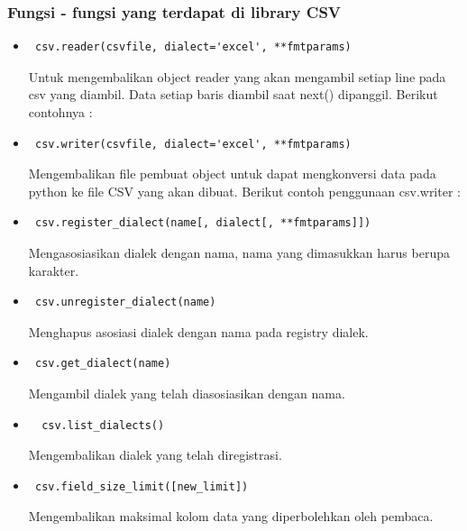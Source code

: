 \subsubsection{Fungsi - fungsi yang terdapat di library CSV}
\begin{itemize}
	\item \begin{verbatim} csv.reader(csvfile, dialect='excel', **fmtparams) \end{verbatim} Untuk mengembalikan	object reader yang akan mengambil setiap line pada csv yang diambil. Data setiap baris diambil saat next() dipanggil. Berikut contohnya : 
	\item \begin{verbatim} csv.writer(csvfile, dialect='excel', **fmtparams) \end{verbatim} Mengembalikan file pembuat object untuk dapat mengkonversi data pada python ke file CSV yang akan dibuat. Berikut contoh penggunaan csv.writer : 
	\item \begin{verbatim} csv.register_dialect(name[, dialect[, **fmtparams]]) \end{verbatim} Mengasosiasikan dialek dengan nama, nama yang dimasukkan harus berupa karakter.
	\item \begin{verbatim} csv.unregister_dialect(name) \end{verbatim}
	Menghapus asosiasi dialek dengan nama pada registry dialek.
	\item \begin{verbatim} csv.get_dialect(name) \end{verbatim}
	Mengambil dialek yang telah diasosiasikan dengan nama. 
	\item \begin{verbatim}  csv.list_dialects() \end{verbatim} Mengembalikan dialek yang telah diregistrasi.
	\item \begin{verbatim} csv.field_size_limit([new_limit]) \end{verbatim} Mengembalikan maksimal kolom data yang diperbolehkan oleh pembaca.
\end{itemize}
